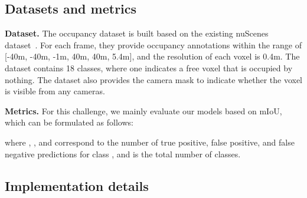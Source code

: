 \documentclass[10pt,twocolumn,letterpaper]{article}
\begin{document}
\subsection{Datasets and metrics}
\noindent\textbf{Dataset.} The occupancy dataset is built based on the existing nuScenes dataset~\cite{tian2023occ3d,caesar2020nuscenes}. For each frame, they provide occupancy annotations within the range of [-40m, -40m, -1m, 40m, 40m, 5.4m], and the resolution of each voxel is 0.4m. The dataset contains 18 classes, where one indicates a free voxel that is occupied by nothing. The dataset also provides the camera mask to indicate whether the voxel is visible from any cameras.

\vspace{2mm}
\noindent\textbf{Metrics.} For this challenge, we mainly evaluate our models based on mIoU, which can be formulated as follows:

where , , and  correspond to the number of true positive, false positive, and false negative predictions for class , and  is the total number of classes.

\subsection{Implementation details}
\end{document}
